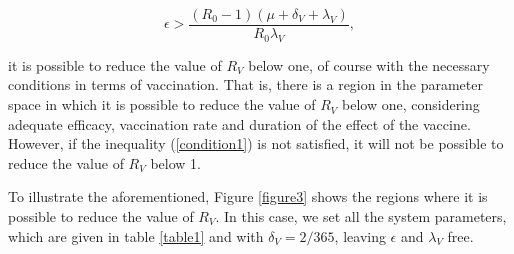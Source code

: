 \documentclass[preprint, sort&compress]{elsarticle}
\begin{document}
\begin{equation}\label{condition1}
\epsilon>\frac{(R_0-1)(\mu+\delta_V+\lambda_V)}{R_0\lambda_V},
\end{equation}

\noindent it is possible to reduce the value of $ R_V $ below one, of course with the necessary conditions in terms of vaccination. That is, there is a region in the parameter space in which it is possible to reduce the value of $ R_V $ below one, considering adequate efficacy, vaccination rate and duration of the effect of the vaccine. However, if the inequality (\ref{condition1}) is not satisfied, it will not be possible to reduce the value of $ R_V $ below 1.

To illustrate the aforementioned, Figure \ref{figure3} shows the regions where it is possible to reduce the value of $ R_V $. In this case, we set all the system parameters, which are given in table \ref{table1} and with $ \delta_V = 2/365 $, leaving $ \epsilon $ and $ \lambda_V $ free. 
\end{document}
